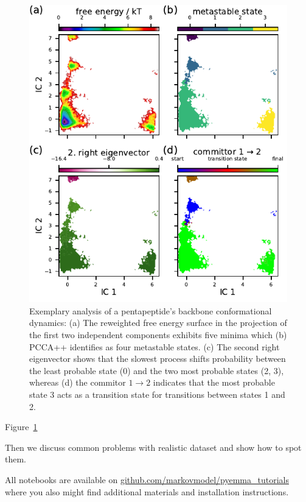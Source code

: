 \documentclass[9pt,tutorial,lineno,onehalfspacing]{livecoms}
\newcommand{\githubrepository}{\url{github.com/markovmodel/pyemma_tutorials}}
\begin{document}
\begin{figure}
\includegraphics{figure_2}
\caption{Exemplary analysis of a pentapeptide's backbone conformational dynamics: (a) The reweighted free energy surface in the projection of the first two independent components exhibits five minima which (b) PCCA++ identifies as four metastable states. (c) The second right eigenvector shows that the slowest process shifts probability between the least probable state (0) and the two most probable states (2, 3), whereas (d) the commitor $1\to2$ indicates that the most probable state 3 acts as a transition state for transitions between states 1 and 2.}
\label{fig:msm-analysis}
\end{figure}

Figure~\ref{fig:msm-analysis}

Then we discuss common problems with realistic dataset and show how to spot them.

All notebooks are available on \githubrepository{} where you also might find additional materials and installation instructions.
\end{document}
